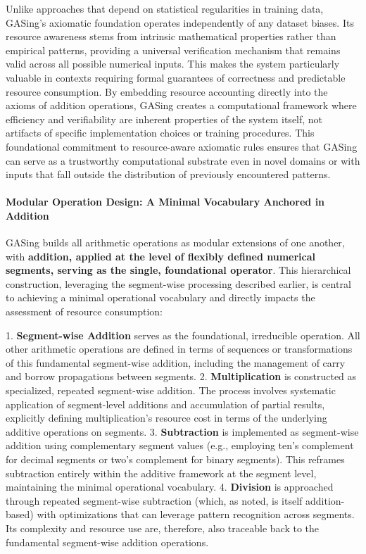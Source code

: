 Unlike approaches that depend on statistical regularities in training data, GASing's axiomatic foundation operates independently of any dataset biases. Its resource awareness stems from intrinsic mathematical properties rather than empirical patterns, providing a universal verification mechanism that remains valid across all possible numerical inputs. This makes the system particularly valuable in contexts requiring formal guarantees of correctness and predictable resource consumption. By embedding resource accounting directly into the axioms of addition operations, GASing creates a computational framework where efficiency and verifiability are inherent properties of the system itself, not artifacts of specific implementation choices or training procedures. This foundational commitment to resource-aware axiomatic rules ensures that GASing can serve as a trustworthy computational substrate even in novel domains or with inputs that fall outside the distribution of previously encountered patterns.
\paragraph{Modular Operation Design: A Minimal Vocabulary Anchored in Addition}

GASing builds all arithmetic operations as modular extensions of one another, with \textbf{addition, applied at the level of flexibly defined numerical segments, serving as the single, foundational operator}. This hierarchical construction, leveraging the segment-wise processing described earlier, is central to achieving a minimal operational vocabulary and directly impacts the assessment of resource consumption:

1.  \textbf{Segment-wise Addition} serves as the foundational, irreducible operation. All other arithmetic operations are defined in terms of sequences or transformations of this fundamental segment-wise addition, including the management of carry and borrow propagations between segments.
2.  \textbf{Multiplication} is constructed as specialized, repeated segment-wise addition. The process involves systematic application of segment-level additions and accumulation of partial results, explicitly defining multiplication's resource cost in terms of the underlying additive operations on segments.
3.  \textbf{Subtraction} is implemented as segment-wise addition using complementary segment values (e.g., employing ten's complement for decimal segments or two's complement for binary segments). This reframes subtraction entirely within the additive framework at the segment level, maintaining the minimal operational vocabulary.
4.  \textbf{Division} is approached through repeated segment-wise subtraction (which, as noted, is itself addition-based) with optimizations that can leverage pattern recognition across segments. Its complexity and resource use are, therefore, also traceable back to the fundamental segment-wise addition operations.


